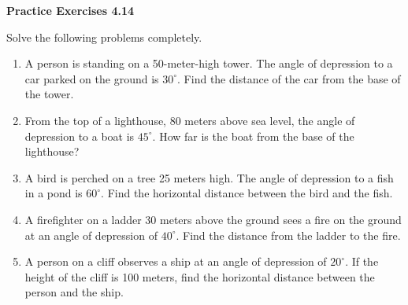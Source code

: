 \vspace{0.3ex}
\noindent\textbf{Practice Exercises 4.14}

\vspace{0.2ex}

Solve the following problems completely. 

\begin{enumerate}
    \item A person is standing on a 50-meter-high tower. The angle of depression to a car parked on the ground is \(30^\circ\). Find the distance of the car from the base of the tower.

    \item From the top of a lighthouse, 80 meters above sea level, the angle of depression to a boat is \(45^\circ\). How far is the boat from the base of the lighthouse?

    \item A bird is perched on a tree 25 meters high. The angle of depression to a fish in a pond is \(60^\circ\). Find the horizontal distance between the bird and the fish.

    \item A firefighter on a ladder 30 meters above the ground sees a fire on the ground at an angle of depression of \(40^\circ\). Find the distance from the ladder to the fire.

    \item A person on a cliff observes a ship at an angle of depression of \(20^\circ\). If the height of the cliff is 100 meters, find the horizontal distance between the person and the ship.





\end{enumerate}
